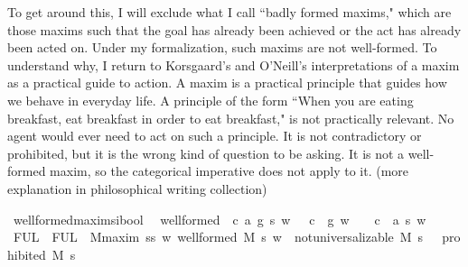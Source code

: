 \begin{isabellebody}
\begin{isamarkuptext}
To get around this, I will exclude what I call ``badly formed maxims," which are those maxims such that the goal has already been 
achieved or the act has already been acted on. Under my formalization, such maxims are 
not well-formed. To understand why, I return to Korsgaard's and O'Neill's interpretations of a maxim as a practical
guide to action. A maxim is a practical principle that guides how we behave in everyday life. A 
principle of the form ``When you are eating breakfast, eat breakfast in order to eat breakfast," is not 
practically relevant. No agent would ever need to act on such a principle. It is not contradictory
or prohibited, but it is the wrong kind of question to be asking. It is not a 
well-formed maxim, so the categorical imperative does not apply to it. (more explanation in philosophical 
writing collection)%
\end{isamarkuptext}\isamarkuptrue%
\isamarkupfalse%
\ well{\isacharunderscore}formed{\isacharcolon}{\isacharcolon}{\isachardoublequoteopen}maxim{\isasymRightarrow}s{\isasymRightarrow}i{\isasymRightarrow}bool{\isachardoublequoteclose}\ \ \isanewline
{\isachardoublequoteopen}well{\isacharunderscore}formed\ {\isasymequiv}\ {\isasymlambda}{\isacharparenleft}c{\isacharcomma}\ a{\isacharcomma}\ g{\isacharparenright}\ s\ w{\isachardot}\ {\isacharparenleft}{\isasymnot}\ {\isacharparenleft}\ {\isacharparenleft}c\ \isactrlbold {\isasymrightarrow}\ g{\isacharparenright}\ w{\isacharparenright}{\isacharparenright}\ {\isasymand}\ {\isacharparenleft}{\isasymnot}\ {\isacharparenleft}\ {\isacharparenleft}c\ \isactrlbold {\isasymrightarrow}\ a\ s{\isacharparenright}\ w{\isacharparenright}{\isacharparenright}{\isachardoublequoteclose}\isanewline
%
\isanewline
\isanewline
{}\isamarkupfalse%
\ FUL\ \ {\isachardoublequoteopen}FUL\ {\isasymequiv}\ {\isasymforall}M{\isacharcolon}{\isacharcolon}maxim{\isachardot}\ {\isasymforall}s{\isacharcolon}{\isacharcolon}s{\isachardot}\ {\isacharparenleft}{\isasymforall}w{\isachardot}\ well{\isacharunderscore}formed\ M\ s\ w{\isacharparenright}\ {\isasymlongrightarrow}\ {\isacharparenleft}not{\isacharunderscore}universalizable\ M\ s\ {\isasymlongrightarrow}\ {\isasymTurnstile}\ prohibited\ M\ s\ {\isacharparenright}{\isachardoublequoteclose}\isanewline
%
\end{isabellebody}
